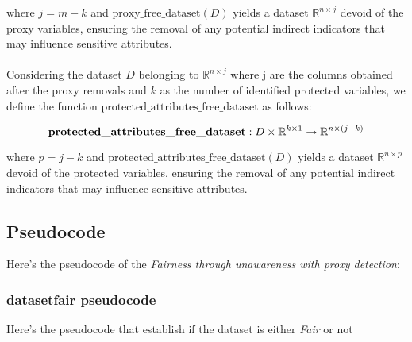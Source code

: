 \documentclass[12pt,a4paper,openright,twoside]{book}
\begin{document}
where \( j = m - k \) and \( \text{proxy\_free\_dataset}(D) \) yields a dataset \( \mathbb{R}^{n \times j} \) devoid of the proxy variables, ensuring the removal of any potential indirect indicators that may influence sensitive attributes. \\
\\
Considering the dataset \( D \) belonging to \( \mathbb{R}^{n \times j} \) where j are the columns obtained after the proxy removals and \( k \) as the number of identified protected variables, we define the function \( \text{protected\_attributes\_free\_dataset} \) as follows:

\[
\text{\textbf{protected\_attributes\_free\_dataset}}: D \times \mathbb{R}^{k \times 1} \rightarrow \mathbb{R}^{n \times (j - k)}
\]

where \( p = j - k \) and \( \text{protected\_attributes\_free\_dataset}(D) \) yields a dataset \( \mathbb{R}^{n \times p} \) devoid of the protected variables, ensuring the removal of any potential indirect indicators that may influence sensitive attributes.

\subsection{Pseudocode}
Here's the pseudocode of the \emph{Fairness through unawareness with proxy detection}:

\begin{algorithm}[H]
\end{algorithm}

\subsubsection{dataset\textunderscore fair pseudocode}
Here's the pseudocode that establish if the dataset is either \emph{Fair} or not

\begin{algorithm}[H]
\end{algorithm}
\end{document}
